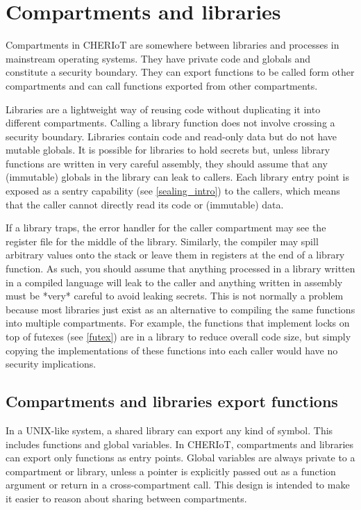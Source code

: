 \chapter[label=compartments]{Compartments and libraries}

Compartments in CHERIoT are somewhere between libraries and processes in mainstream operating systems.
They have private code and globals and constitute a security boundary.
They can export functions to be called form other compartments and can call functions exported from other compartments.

Libraries are a lightweight way of reusing code without duplicating it into different compartments.
Calling a library function does not involve crossing a security boundary.
Libraries contain code and read-only data but do not have mutable globals.
It is possible for libraries to hold secrets but, unless library functions are written in very careful assembly, they should assume that any (immutable) globals in the library can leak to callers.
Each library entry point is exposed as a sentry capability (see \ref{sealing_intro}) to the callers, which means that the caller cannot directly read its code or (immutable) data.

\begin{warning}
If a library traps, the error handler for the caller compartment may see the register file for the middle of the library.
Similarly, the compiler may spill arbitrary values onto the stack or leave them in registers at the end of a library function.
As such, you should assume that anything processed in a library written in a compiled language will leak to the caller and anything written in assembly must be *very* careful to avoid leaking secrets.
This is not normally a problem because most libraries just exist as an alternative to compiling the same functions into multiple compartments.
For example, the functions that implement locks on top of futexes (see \ref{futex}) are in a library to reduce overall code size, but simply copying the implementations of these functions into each caller would have no security implications.
\end{warning}

\section{Compartments and libraries export functions}

In a UNIX-like system, a shared library can export any kind of symbol.
This includes functions and global variables.
In CHERIoT, compartments and libraries can export only functions as entry points.
Global variables are always private to a compartment or library, unless a pointer is explicitly passed out as a function argument or return in a cross-compartment call.
This design is intended to make it easier to reason about sharing between compartments.

